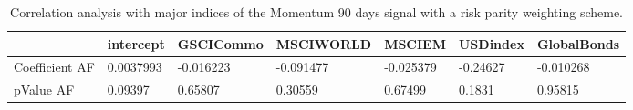 \begin{table}[H]
\centering
\begin{tabular}{lllllll}
& intercept & GSCICommo & MSCIWORLD & MSCIEM & USDindex & GlobalBonds \\ 
\hline 
Coefficient AF & 0.0037993 & -0.016223 & -0.091477 & -0.025379 & -0.24627 & -0.010268 \\ 
pValue AF & 0.09397 & 0.65807 & 0.30559 & 0.67499 & 0.1831 & 0.95815 \\ 
\hline
\end{tabular}
\caption{Correlation analysis with major indices of the Momentum 90 days signal with a risk parity weighting scheme.}
\label{MOM90RP_AFACTOR}
\end{table}